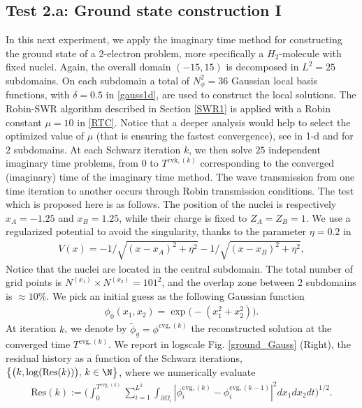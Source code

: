 \subsection{Test 2.a: Ground state construction I}\label{testB}
In this next experiment, we apply the imaginary time method for constructing the ground state of a 2-electron problem, more specifically a $H_2$-molecule with fixed nuclei. Again, the overall domain $(-15,15)$ is decomposed in $L^2=25$ subdomains. On each subdomain a total of $N_{\phi}^2=36$ Gaussian local basis functions, with $\delta=0.5$ in \eqref{gauss1d}, are used to construct the local solutions. The Robin-SWR algorithm described in Section \ref{SWR1} is applied with a Robin constant $\mu=10$ in \eqref{RTC}. Notice that a deeper analysis would help to select the optimized value of $\mu$ (that is ensuring the fastest convergence), see \cite{halpern2} in 1-d and for $2$ subdomains. At each Schwarz iteration $k$, we then solve $25$ independent imaginary time problems, from $0$ to $T^{\textrm{cvk},(k)}$ corresponding to the converged (imaginary) time of the imaginary time method. The wave transmission from one time iteration to another occurs through Robin transmission conditions. The test which is proposed here is as follows. The position of the nuclei is respectively $x_A=-1.25$ and $x_B=1.25$, while their charge is fixed to $Z_A=Z_B=1$. We use a regularized potential to avoid the singularity, thanks to the parameter $\eta=0.2$ in 
\begin{eqnarray}\label{pseudo}
V(x) = -1/\sqrt{(x-x_A)^2+\eta^2} -1/\sqrt{(x-x_B)^2+\eta^2},
\end{eqnarray}
Notice that the nuclei are located in the central subdomain. The total number of grid points is $N^{(x_1)}\times N^{(x_2)}=101^2$, and the overlap zone between 2 subdomains is $\approx 10\%$. We pick an initial guess as the following Gaussian function
\begin{eqnarray*}
\phi_0(x_1,x_2) = \exp\big(-(x_1^2+x_2^2)\big).
\end{eqnarray*}
At iteration $k$, we denote by $\widetilde{\phi}_g=\phi^{\textrm{cvg},(k)}$ the reconstructed solution at the converged time $T^{\textrm{cvg},(k)}$. We report in logscale Fig. \ref{ground_Gauss} (Right), the residual history as a function of the Schwarz iterations, $\big\{\big(k,\log(\textrm{Res}(k))\big), \, k \in \N\big\}$, where we numerically evaluate
\begin{eqnarray}\label{residueIT}
\textrm{Res}(k):=\Big(\int_0^{T^{\textrm{cvg},(k)}}\sum_{i=1}^{L^2}\int_{\partial \Omega_i}|\phi_i^{\textrm{cvg},(k)}-\phi_i^{\textrm{cvg},(k-1)}|^2dx_1dx_2dt\Big)^{1/2}.
\end{eqnarray}
